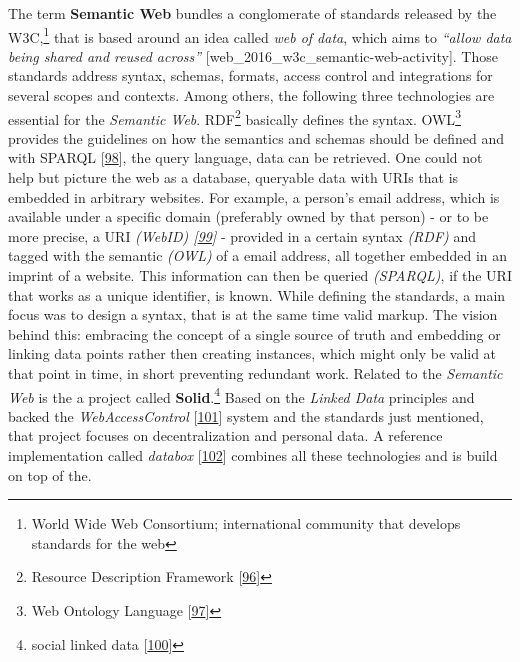 \documentclass[12pt,english,a4paper,titlepage,cleardoublepage=empty,dottedtoc]{report}
\begin{document}
The term \textbf{\protect\hypertarget{link-semantic-web}{}{Semantic
Web}} bundles a conglomerate of standards released by the W3C,\footnote{World
  Wide Web Consortium; international community that develops standards
  for the web} that is based around an idea called \emph{web of data},
which aims to \emph{``allow data being shared and reused across''}
{[}web\_2016\_w3c\_semantic-web-activity{]}. Those standards address
syntax, schemas, formats, access control and integrations for several
scopes and contexts. Among others, the following three technologies are
essential for the \emph{Semantic Web}. RDF\footnote{Resource Description
  Framework {[}\protect\hyperlink{ref-web_w3c-tr_rdf}{96}{]}} basically
defines the syntax. OWL\footnote{Web Ontology Language
  {[}\protect\hyperlink{ref-web_w3c-tr_owl}{97}{]}} provides the
guidelines on how the semantics and schemas should be defined and with
\protect\hypertarget{link-sparql}{}{SPARQL}
{[}\protect\hyperlink{ref-web_w3c-tr_sparql}{98}{]}, the query language,
data can be retrieved. One could not help but picture the web as a
database, queryable data with URIs that is embedded in arbitrary
websites. For example, a person's email address, which is available
under a specific domain (preferably owned by that person) - or to be
more precise, a URI \emph{(WebID)
{[}\protect\hyperlink{ref-web_w3c-draft_webid}{99}{]}} - provided in a
certain syntax \emph{(RDF)} and tagged with the semantic \emph{(OWL)} of
a email address, all together embedded in an imprint of a website. This
information can then be queried \emph{(SPARQL)}, if the URI that works
as a unique identifier, is known. While defining the standards, a main
focus was to design a syntax, that is at the same time valid markup. The
vision behind this: embracing the concept of a single source of truth
and embedding or linking data points rather then creating instances,
which might only be valid at that point in time, in short preventing
redundant work. Related to the \emph{Semantic Web} is the a project
called \textbf{Solid}.\footnote{social linked data
  {[}\protect\hyperlink{ref-web_spec_solid}{100}{]}} Based on the
\emph{Linked Data} principles and backed the \emph{WebAccessControl}
{[}\protect\hyperlink{ref-web_2016_wiki_webaccesscontrol}{101}{]} system
and the standards just mentioned, that project focuses on
decentralization and personal data. A reference implementation called
\emph{databox} {[}\protect\hyperlink{ref-web_2016_demo_databox}{102}{]}
combines all these technologies and is build on top of the.
\end{document}
